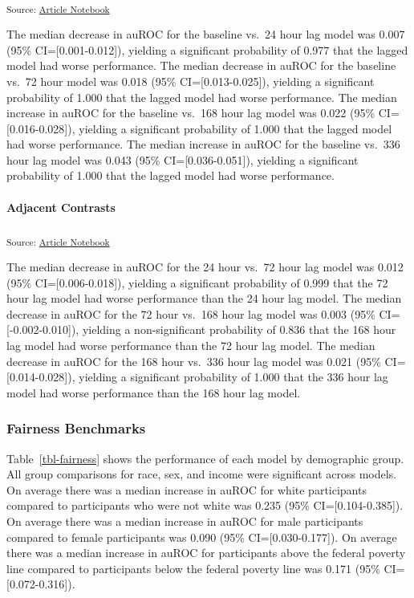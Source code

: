 \documentclass[
]{agujournal2019}
\let\oldparagraph\paragraph
\renewcommand{\paragraph}[1]{\oldparagraph{#1}\mbox{}}
\begin{document}
\textsubscript{Source:
\href{https://jjcurtin.github.io/study_lag/index.qmd.html}{Article
Notebook}}

The median decrease in auROC for the baseline vs.~24 hour lag model was
0.007 (95\% CI={[}0.001-0.012{]}), yielding a significant probability of
0.977 that the lagged model had worse performance. The median decrease
in auROC for the baseline vs.~72 hour model was 0.018 (95\%
CI={[}0.013-0.025{]}), yielding a significant probability of 1.000 that
the lagged model had worse performance. The median increase in auROC for
the baseline vs.~168 hour lag model was 0.022 (95\%
CI={[}0.016-0.028{]}), yielding a significant probability of 1.000 that
the lagged model had worse performance. The median increase in auROC for
the baseline vs.~336 hour lag model was 0.043 (95\%
CI={[}0.036-0.051{]}), yielding a significant probability of 1.000 that
the lagged model had worse performance.

\paragraph{Adjacent Contrasts}\label{adjacent-contrasts}

\textsubscript{Source:
\href{https://jjcurtin.github.io/study_lag/index.qmd.html}{Article
Notebook}}

The median decrease in auROC for the 24 hour vs.~72 hour lag model was
0.012 (95\% CI={[}0.006-0.018{]}), yielding a significant probability of
0.999 that the 72 hour lag model had worse performance than the 24 hour
lag model. The median decrease in auROC for the 72 hour vs.~168 hour lag
model was 0.003 (95\% CI={[}-0.002-0.010{]}), yielding a non-significant
probability of 0.836 that the 168 hour lag model had worse performance
than the 72 hour lag model. The median decrease in auROC for the 168
hour vs.~336 hour lag model was 0.021 (95\% CI={[}0.014-0.028{]}),
yielding a significant probability of 1.000 that the 336 hour lag model
had worse performance than the 168 hour lag model.

\subsubsection{Fairness Benchmarks}\label{fairness-benchmarks-1}

Table~\ref{tbl-fairness} shows the performance of each model by
demographic group. All group comparisons for race, sex, and income were
significant across models. On average there was a median increase in
auROC for white participants compared to participants who were not white
was 0.235 (95\% CI={[}0.104-0.385{]}). On average there was a median
increase in auROC for male participants compared to female participants
was 0.090 (95\% CI={[}0.030-0.177{]}). On average there was a median
increase in auROC for participants above the federal poverty line
compared to participants below the federal poverty line was 0.171 (95\%
CI={[}0.072-0.316{]}).
\end{document}
